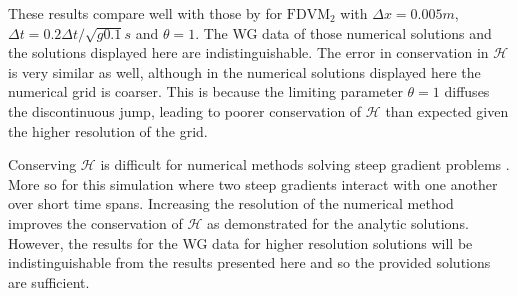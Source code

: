 These results compare well with those by \citet{Zoppou-etal-2017} for $\text{FDVM}_2$ with $\Delta x = 0.005m$, $\Delta t = 0.2 \Delta t / \sqrt{g 0.1} s$ and $\theta = 1$. The WG data of those numerical solutions and the solutions displayed here are indistinguishable. The error in conservation in $\mathcal{H}$ is very similar as well, although in the numerical solutions displayed here the numerical grid is coarser. This is because the limiting parameter $\theta = 1$ diffuses the discontinuous jump, leading to poorer conservation of $\mathcal{H}$ \cite{Pitt-2018-61} than expected given the higher resolution of the grid.

Conserving $\mathcal{H}$ is difficult for numerical methods solving steep gradient problems \cite{Pitt-2018-61}. More so for this simulation where two steep gradients interact with one another over short time spans. Increasing the resolution of the numerical method improves the conservation of $\mathcal{H}$ as demonstrated for the analytic solutions. However, the results for the WG data for higher resolution solutions will be indistinguishable from the results presented here and so the provided solutions are sufficient. 

